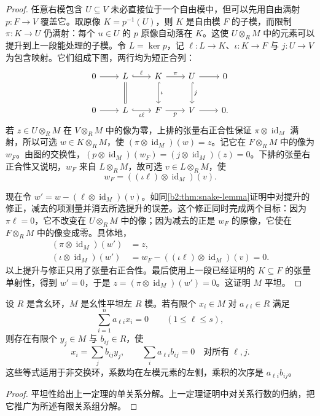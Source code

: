 \begin{proof}
	任意右模包含 \(U\subseteq V\) 未必直接位于一个自由模中，但可以先用自由满射 \(p:F\to V\) 覆盖它。取原像 \(K=p^{-1}(U)\)，则 \(K\) 是自由模 \(F\) 的子模，而限制 \(\pi:K\to U\) 仍满射：每个 \(u\in U\) 的 \(p\) 原像自动落在 \(K\)。这使 \(U\otimes_RM\) 中的元素可以提升到上一段能处理的子模。令 \(L=\ker p\)，记 \(\ell:L\to K\)、\(\iota:K\to F\) 与 \(j:U\to V\) 为包含映射。它们组成下图，两行均为短正合列：
	\[
		\begin{tikzcd}[column sep=2.2em,row sep=2.5em]
			0\arrow[r]&L\arrow[r,hook,"\ell"]\arrow[d,equal]&K\arrow[r,"\pi"]\arrow[d,hook,"\iota"]&U\arrow[r]\arrow[d,hook,"j"]&0\\
			0\arrow[r]&L\arrow[r,hook,"\iota\ell"']&F\arrow[r,"p"']&V\arrow[r]&0.
		\end{tikzcd}
	\]
	若 \(z\in U\otimes_R M\) 在 \(V\otimes_R M\) 中的像为零，上排的张量右正合性保证 \(\pi\otimes\operatorname{id}_M\) 满射，所以可选 \(w\in K\otimes_R M\)，使 \((\pi\otimes\operatorname{id}_M)(w)=z\)。记它在 \(F\otimes_R M\) 中的像为 \(w_F\)。由图的交换性，\((p\otimes\operatorname{id}_M)(w_F)=(j\otimes\operatorname{id}_M)(z)=0\)。下排的张量右正合性又说明，\(w_F\) 来自 \(L\otimes_R M\)，故可选 \(v\in L\otimes_R M\)，使
	\[
		w_F=((\iota\ell)\otimes\operatorname{id}_M)(v).
	\]

	现在令 \(w'=w-(\ell\otimes\operatorname{id}_M)(v)\)。如同\cref{b2:thm:snake-lemma}证明中对提升的修正，减去的项测量并消去所选提升的误差。这个修正同时完成两个目标：因为 \(\pi\ell=0\)，它不改变在 \(U\otimes_RM\) 中的像；因为减去的正是 \(w_F\) 的原像，它使在 \(F\otimes_RM\) 中的像变成零。具体地，
	\[
		\begin{aligned}
			(\pi\otimes\operatorname{id}_M)(w')&=z,\\
			(\iota\otimes\operatorname{id}_M)(w')&=w_F-((\iota\ell)\otimes\operatorname{id}_M)(v)=0.
		\end{aligned}
	\]
	以上提升与修正只用了张量右正合性。最后使用上一段已经证明的 \(K\subseteq F\) 的张量单射性，得到 \(w'=0\)，于是 \(z=(\pi\otimes\operatorname{id}_M)(w')=0\)。这证明 \(M\) 平坦。
\end{proof}

\begin{corollary}[有限关系组分解]\label{b2:cor:flat-finite-relation-systems}
	设 \(R\) 是含幺环，\(M\) 是幺性平坦左 \(R\) 模。若有限个 \(x_i\in M\) 对 \(a_{\ell i}\in R\) 满足
	\[
		\sum_{i=1}^n a_{\ell i}x_i=0\qquad(1\le\ell\le s),
	\]
	则存在有限个 \(y_j\in M\) 与 \(b_{ij}\in R\)，使
	\[
		x_i=\sum_j b_{ij}y_j,\qquad \sum_i a_{\ell i}b_{ij}=0\quad\text{对所有}\;\ell,j.
	\]
	这些等式适用于非交换环，系数均在左模元素的左侧，乘积的次序是 \(a_{\ell i}b_{ij}\)。
\end{corollary}
\begin{proof}
	平坦性给出上一定理的单关系分解。上一定理证明中对关系行数的归纳，把它推广为所述有限关系组分解。
\end{proof}

